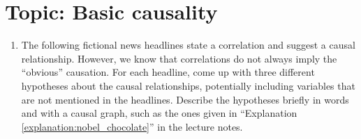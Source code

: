 \makeatletter
\g@addto@macro{\UrlBreaks}{\UrlOrds}
\makeatother


\section*{Topic: Basic causality}

\begin{enumerate}
    \item %
    The following fictional news headlines state a correlation and suggest a causal relationship. However, we know that correlations do not always imply the ``obvious'' causation. For each headline, come up with three different hypotheses about the causal relationships, potentially including variables that are not mentioned in the headlines. Describe the hypotheses briefly in words and with a causal graph, such as the ones given in ``Explanation \ref*{explanation:nobel_chocolate}'' in the lecture notes.


\end{enumerate}
